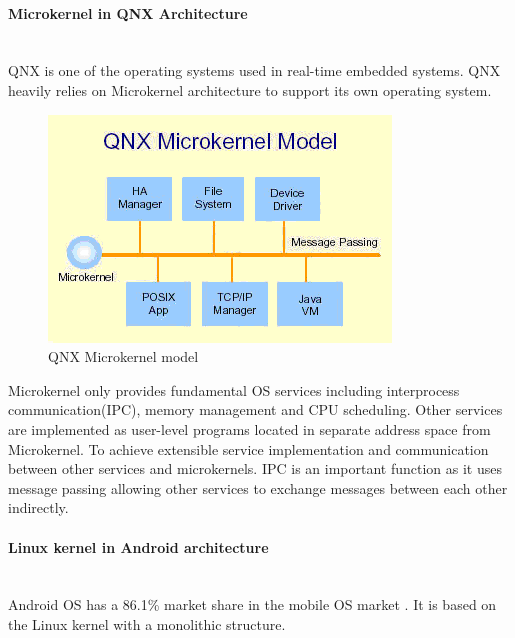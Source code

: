 \documentclass[conference]{IEEEtran}
\newcommand{\forceindent}{\leavevmode{\parindent=1em\indent}}
\begin{document}
\paragraph{Microkernel in QNX Architecture} \mbox{} \\
\forceindent QNX is one of the operating systems used in real-time embedded systems. QNX heavily relies on Microkernel architecture to support its own operating system\cite{Burger}\cite{Galvinbook}.



\begin{figure}[h]
\caption{QNX Microkernel model}
\begin{center}
\includegraphics[scale=0.5]{./images/QNX_microkernel_mode.png}
\end{center}
\end{figure}

\forceindent Microkernel only provides fundamental OS services including interprocess communication(IPC), memory management and CPU scheduling\cite{Galvinbook}. Other services are implemented as user-level programs located in separate address space from Microkernel\cite{Galvinbook}. To achieve extensible service implementation and communication between other services and microkernels. IPC is an important function as it uses message passing\cite{Burger} allowing other services to exchange messages between each other indirectly.

\paragraph{Linux kernel in Android architecture} \mbox{} \\
\forceindent Android OS has a 86.1\% market share in the mobile OS market \cite{SMS}. It is based on the Linux kernel with a monolithic structure.
\end{document}

